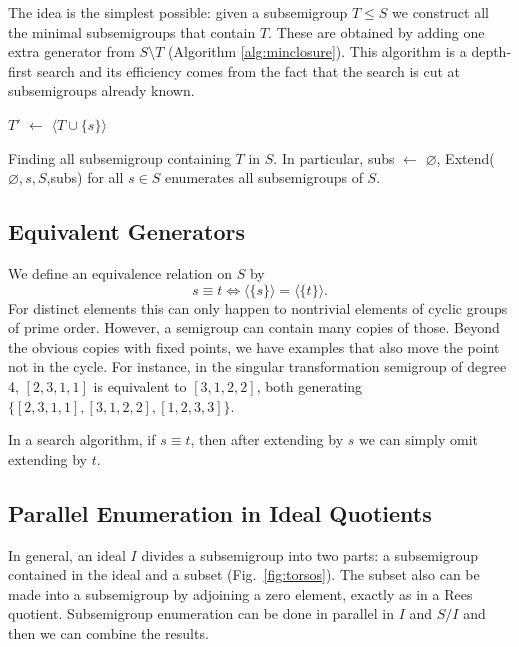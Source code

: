 \documentclass{amsart}
\theoremstyle{plain}
\theoremstyle{definition}
\begin{document}
The idea is the simplest possible: given a subsemigroup $T\leq S$ we construct all the minimal subsemigroups that contain $T$.
These are obtained by adding one extra generator from $S\setminus T$ (Algorithm \ref{alg:minclosure}).
This algorithm is a depth-first search and its efficiency comes from the fact that the search is cut at subsemigroups already known. 
\begin{algorithm}
\BlankLine
\Name{}
$T'$ $\leftarrow$ $\langle T\cup\{s\}\rangle$\\
\caption{Finding all subsemigroup containing $T$ in $S$. In particular, \textsf{subs} $\leftarrow$ $\varnothing$,  \textsf{Extend}($\varnothing,s,S$,\textsf{subs}) for all  $s\in S$ enumerates all subsemigroups of $S$.}
\label{alg:minclosure}
\end{algorithm}

\subsection{Equivalent Generators}

We define an equivalence relation on $S$ by
$$ s\equiv t \Longleftrightarrow \langle\{s\} \rangle= \langle\{t\} \rangle.$$
For distinct elements this can only happen to nontrivial elements of cyclic groups of prime order.
However, a semigroup can contain many copies of those.
Beyond the obvious copies with fixed points, we have examples that also move the point not in the cycle. For instance, in the singular transformation semigroup of degree 4, $[ 2, 3, 1, 1 ]$ is equivalent to  $[ 3, 1, 2, 2 ]$, both generating $\{ [ 2, 3, 1, 1 ], [ 3, 1, 2, 2 ], [ 1, 2, 3, 3 ]\}$.

In a search algorithm, if $s\equiv t$, then after extending by $s$ we can simply omit extending by $t$.
\subsection{Parallel Enumeration in Ideal Quotients}
In general, an ideal $I$ divides a subsemigroup into two parts: a subsemigroup contained in the ideal and a subset (Fig.\ \ref{fig:torsos}).
The subset also can be made into a subsemigroup by adjoining a zero element, exactly as in a Rees quotient. 
Subsemigroup enumeration can be done in parallel in $I$ and $S/I$  and then  we can combine the results.
\end{document}
